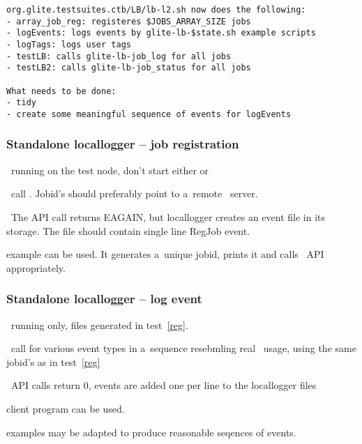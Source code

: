 \begin{verbatim}
org.glite.testsuites.ctb/LB/lb-l2.sh now does the following:
- array_job_reg: registeres $JOBS_ARRAY_SIZE jobs
- logEvents: logs events by glite-lb-$state.sh example scripts
- logTags: logs user tags
- testLB: calls glite-lb-job_log for all jobs
- testLB2: calls glite-lb-job_status for all jobs

What needs to be done:
- tidy
- create some meaningful sequence of events for logEvents
\end{verbatim}



\subsubsection{Standalone locallogger -- job registration}
\label{reg}
\req\ running  on the test node, don't start either
 or 

\how\ call . Jobid's should preferably point
to a~remote \LB\ server.

\result\ The API call returns EAGAIN, but locallogger creates an event file
in its storage.
The file should contain single line RegJob event.

\begin{hints}
 example can be used. It generates a~unique jobid,
prints it and calls \LB\ API appropriately.
\end{hints}

\subsubsection{Standalone locallogger -- log event}
\label{log}
\req\ running  only, files generated in test~\ref{reg}.

\how\ call  for various event types in a~sequence
resebmling real \LB\ usage, using the same jobid's as in test~\ref{reg}

\result\ API calls return 0, events are added one per line to the locallogger files

\begin{hints}
 client program can be used.

 examples may be adapted to produce reasonable seqences
of events.
\end{hints}


